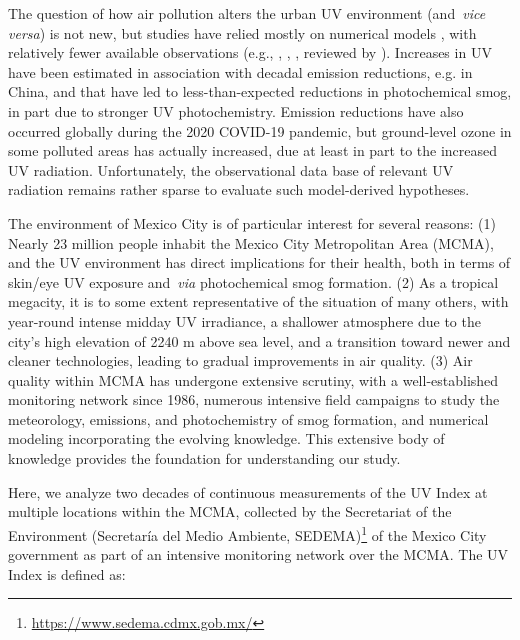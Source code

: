 \documentclass[journal=jacsat,manuscript=article]{achemso}
\begin{document}
The question of how air pollution alters the urban UV environment
(and~\emph{vice versa}) is not new, but studies have relied mostly on
numerical models \cite{Liu_1991,Sabziparvar_1998,Madronich_2011},
with relatively fewer available observations (e.g.,
\citet{McKenzie_2008}, \citet{Panicker_2009}, \citet{Palancar_2013},
reviewed by \citet{Bais_2015}). Increases in UV have been
estimated in association with decadal emission reductions, e.g. in
China,\citep{Hollaway_2019,Li_2018,Wang_2020}
and that have led to less-than-expected
reductions in photochemical smog, in part due to stronger UV
photochemistry.\citep{Wang_2019,Gao_2020,Ma_2020}
Emission reductions have also occurred
globally during the 2020 COVID-19 pandemic,\citep{Bauwens_2020,Venter_2020}
but ground-level ozone in some polluted areas has actually
increased,\citep{Shi_2020,Le_2020} due at least in part to the increased UV
radiation. Unfortunately, the observational data base of relevant UV
radiation remains rather sparse to evaluate such model-derived
hypotheses.~~

The environment of Mexico City is of particular interest for several
reasons: (1) Nearly 23 million people inhabit the Mexico City
Metropolitan Area (MCMA), and the UV environment has direct implications
for their health, both in terms of skin/eye UV exposure and~\emph{via}
photochemical smog formation. (2) As a tropical megacity, it is to some
extent representative of the situation of many others, with year-round
intense midday UV irradiance, a shallower atmosphere due to the city's
high elevation of 2240 m above sea level, and a transition toward newer
and cleaner technologies, leading to gradual improvements in air
quality. (3) Air quality within MCMA has undergone extensive scrutiny,
with a well-established monitoring network since
1986,\cite{RAMA}
numerous intensive field campaigns to study the
meteorology, emissions, and photochemistry of smog
formation,\citep{Doran_1998,Molina_2007,Molina_2010}
and numerical modeling incorporating the
evolving knowledge.\citep{Jazcilevich_2005,Tie_2007,Zhang_2009,Zavala_2020}
This extensive body of knowledge
provides the foundation for understanding our study.

Here, we analyze two decades of continuous measurements of the UV Index
at multiple locations within the MCMA, collected by the Secretariat of
the Environment (Secretaría del Medio Ambiente,
SEDEMA)\footnote{\url{https://www.sedema.cdmx.gob.mx/}} of the Mexico
City government as part of an intensive monitoring network over the
MCMA. The UV Index is defined as:
\end{document}
